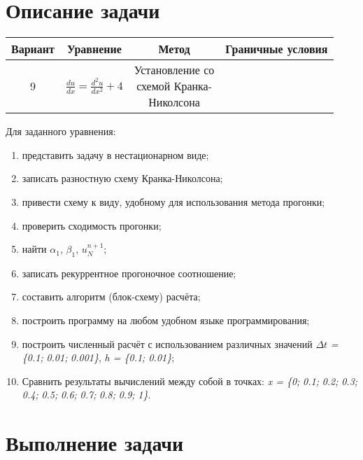 \documentclass[12pt, a4paper]{report}
\begin{document}
	\section*{Описание задачи}
	\large
	\begin{center}
		\begin{tabular}{||c|c|c|c||}
			\hline
			Вариант & Уравнение & Метод & Граничные условия \\
			\hline
			9 & $ \frac{du}{dx}=\frac{d^{2}u}{dx^{2}}+4$ & \makecell{Установление со \\ схемой Кранка- \\ Николсона} & \makecell{$ \begin{cases} u(x = 0) = 1 \\ u(x = 1) = 6.7 \end{cases}$} \\

			\hline
		\end{tabular}
	\end{center}
	\par
	Для заданного уравнения:
	\begin{enumerate}
		\item представить задачу в нестационарном виде;
		\item записать разностную схему Кранка-Николсона;
		\item привести схему к виду, удобному для использования метода прогонки;
		\item проверить сходимость прогонки;
		\item найти $\alpha_1$, $\beta_1$, $u_{N}^{n+1}$;
		\item записать рекуррентное прогоночное соотношение;
		\item составить алгоритм (блок-схему) расчёта;
		\item построить программу на любом удобном языке программирования;
		\item построить численный расчёт с использованием различных значений $\Delta t$ \textit{= \{0.1;} \textit{0.01;} \textit{0.001\}}, \textit{h = \{0.1; 0.01\}};
		\item Сравнить результаты вычислений между собой в точках: \textit{x = \{0;} \textit{0.1;} \textit{0.2;} \textit{0.3;} \textit{0.4;} \textit{0.5;} \textit{0.6;} \textit{0.7;} \textit{0.8;} \textit{0.9;} \textit{1\}}.
	\end{enumerate}

	\newpage

	\section*{Выполнение задачи}
\end{document}

